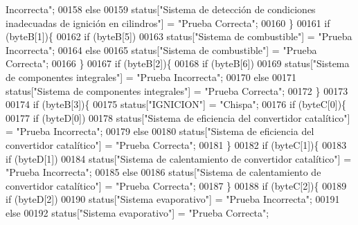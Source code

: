 \begin{DoxyCode}
{       Incorrecta"};
00158         \textcolor{keywordflow}{else}
00159             status[\textcolor{stringliteral}{"Sistema de detección de condiciones inadecuadas de ignición en cilindros"}] = \textcolor{stringliteral}{"Prueba
       Correcta"};
00160     \}
00161     \textcolor{keywordflow}{if} (byteB[1])\{
00162         \textcolor{keywordflow}{if} (byteB[5])
00163             status[\textcolor{stringliteral}{"Sistema de combustible"}] = \textcolor{stringliteral}{"Prueba Incorrecta"};
00164         \textcolor{keywordflow}{else}
00165             status[\textcolor{stringliteral}{"Sistema de combustible"}] = \textcolor{stringliteral}{"Prueba Correcta"};
00166     \}
00167     \textcolor{keywordflow}{if} (byteB[2])\{
00168         \textcolor{keywordflow}{if} (byteB[6])
00169             status[\textcolor{stringliteral}{"Sistema de componentes integrales"}] = \textcolor{stringliteral}{"Prueba Incorrecta"};
00170         \textcolor{keywordflow}{else}
00171             status[\textcolor{stringliteral}{"Sistema de componentes integrales"}] = \textcolor{stringliteral}{"Prueba Correcta"};
00172     \}
00173 
00174     \textcolor{keywordflow}{if} (byteB[3])\{
00175         status[\textcolor{stringliteral}{"IGNICION"}] = \textcolor{stringliteral}{"Chispa"};
00176         \textcolor{keywordflow}{if} (byteC[0])\{
00177             \textcolor{keywordflow}{if} (byteD[0])
00178                 status[\textcolor{stringliteral}{"Sistema de eficiencia del convertidor catalítico"}] = \textcolor{stringliteral}{"Prueba Incorrecta"};
00179             \textcolor{keywordflow}{else}
00180                 status[\textcolor{stringliteral}{"Sistema de eficiencia del convertidor catalítico"}] = \textcolor{stringliteral}{"Prueba Correcta"};
00181         \}
00182         \textcolor{keywordflow}{if} (byteC[1])\{
00183             \textcolor{keywordflow}{if} (byteD[1])
00184                 status[\textcolor{stringliteral}{"Sistema de calentamiento de convertidor catalítico"}] = \textcolor{stringliteral}{"Prueba Incorrecta"};
00185             \textcolor{keywordflow}{else}
00186                 status[\textcolor{stringliteral}{"Sistema de calentamiento de convertidor catalítico"}] = \textcolor{stringliteral}{"Prueba Correcta"};
00187         \}
00188         \textcolor{keywordflow}{if} (byteC[2])\{
00189             \textcolor{keywordflow}{if} (byteD[2])
00190                 status[\textcolor{stringliteral}{"Sistema evaporativo"}] = \textcolor{stringliteral}{"Prueba Incorrecta"};
00191             \textcolor{keywordflow}{else}
00192                 status[\textcolor{stringliteral}{"Sistema evaporativo"}] = \textcolor{stringliteral}{"Prueba Correcta"};

\end{DoxyCode}
